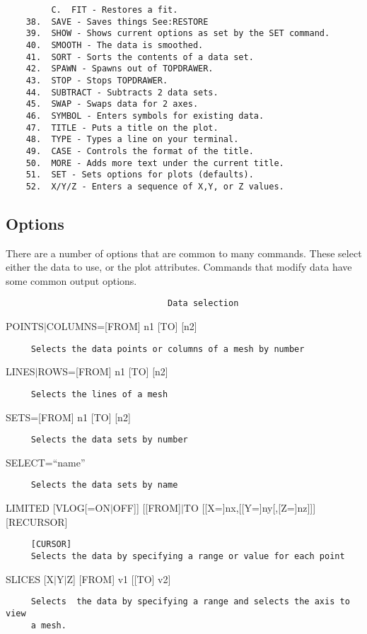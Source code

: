 \begin{verbatim}
         C.  FIT - Restores a fit.  
    38.  SAVE - Saves things See:RESTORE 
    39.  SHOW - Shows current options as set by the SET command.  
    40.  SMOOTH - The data is smoothed.  
    41.  SORT - Sorts the contents of a data set.  
    42.  SPAWN - Spawns out of TOPDRAWER.  
    43.  STOP - Stops TOPDRAWER.  
    44.  SUBTRACT - Subtracts 2 data sets.  
    45.  SWAP - Swaps data for 2 axes.  
    46.  SYMBOL - Enters symbols for existing data.  
    47.  TITLE - Puts a title on the plot.  
    48.  TYPE - Types a line on your terminal.  
    49.  CASE - Controls the format of the title.  
    50.  MORE - Adds more text under the current title.  
    51.  SET - Sets options for plots (defaults).  
    52.  X/Y/Z - Enters a sequence of X,Y, or Z values.  
\end{verbatim}
\subsection{Options}
There  are  a  number of options that are common to many commands.  These
select either the data to use, or the  plot  attributes.   Commands  that
modify data have some common output options.  
\begin{verbatim}
                                Data selection
\end{verbatim}
POINTS$|$COLUMNS=[FROM] n1 [TO] [n2] 
\begin{verbatim}
     Selects the data points or columns of a mesh by number 
\end{verbatim}
LINES$|$ROWS=[FROM] n1 [TO] [n2] 
\begin{verbatim}
     Selects the lines of a mesh 
\end{verbatim}
SETS=[FROM] n1 [TO] [n2] 
\begin{verbatim}
     Selects the data sets by number 
\end{verbatim}
SELECT=``name'' 
\begin{verbatim}
     Selects the data sets by name 
\end{verbatim}
LIMITED  [VLOG[=ON$|$OFF]] [[FROM]$|$TO [[X=]nx,[[Y=]ny[,[Z=]nz]]] [RECURSOR]
\begin{verbatim}
     [CURSOR] 
     Selects the data by specifying a range or value for each point 
\end{verbatim}
SLICES [X$|$Y$|$Z] [FROM] v1 [[TO] v2] 
\begin{verbatim}
     Selects  the data by specifying a range and selects the axis to view
     a mesh.  
\end{verbatim}
